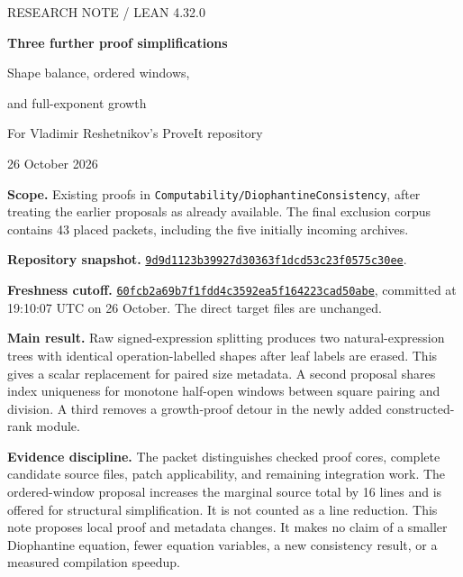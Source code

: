 \documentclass[11pt,letterpaper]{article}
\newcommand{\code}[1]{\texttt{\small #1}}
\begin{document}
\begin{titlepage}
\vspace*{0.6in}
{\sffamily\color{muted}\large RESEARCH NOTE / LEAN 4.32.0\par}
\vspace{0.3in}
{\sffamily\bfseries\color{ink}\LARGE Three further proof simplifications\par}
\vspace{0.15in}
{\sffamily\Large Shape balance, ordered windows,\par and full-exponent growth\par}
\vspace{0.35in}
{\large For Vladimir Reshetnikov's ProveIt repository\par}
\vspace{0.2in}
26 October 2026
\vspace{0.5in}

\textbf{Scope.} Existing proofs in \code{Computability/DiophantineConsistency}, after treating the earlier proposals as already available. The final exclusion corpus contains 43 placed packets, including the five initially incoming archives.

\textbf{Repository snapshot.} \href{https://github.com/VladimirReshetnikov/ProveIt/commit/9d9d1123b39927d30363f1dcd53c23f0575c30ee}{\texttt{9d9d1123b39927d30363f1dcd53c23f0575c30ee}}.

\textbf{Freshness cutoff.} \href{https://github.com/VladimirReshetnikov/ProveIt/commit/60fcb2a69b7f1fdd4c3592ea5f164223cad50abe}{\texttt{60fcb2a69b7f1fdd4c3592ea5f164223cad50abe}}, committed at 19:10:07 UTC on 26 October. The direct target files are unchanged.

\textbf{Main result.} Raw signed-expression splitting produces two natural-expression trees with identical operation-labelled shapes after leaf labels are erased. This gives a scalar replacement for paired size metadata. A second proposal shares index uniqueness for monotone half-open windows between square pairing and division. A third removes a growth-proof detour in the newly added constructed-rank module.

\textbf{Evidence discipline.} The packet distinguishes checked proof cores, complete candidate source files, patch applicability, and remaining integration work. The ordered-window proposal increases the marginal source total by 16 lines and is offered for structural simplification. It is not counted as a line reduction.
\vfill
{\small\color{muted}This note proposes local proof and metadata changes. It makes no claim of a smaller Diophantine equation, fewer equation variables, a new consistency result, or a measured compilation speedup.}
\end{titlepage}
\end{document}
